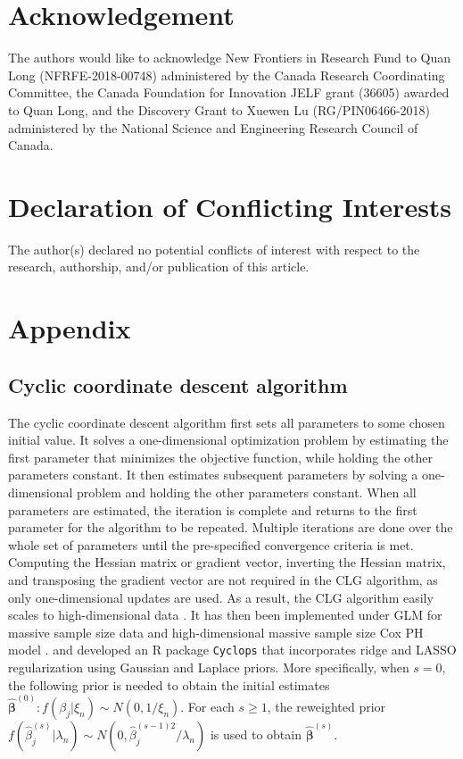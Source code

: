 \documentclass[11pt]{article}
\begin{document}
\section*{Acknowledgement}
The authors would like to acknowledge New Frontiers in Research Fund to Quan Long (NFRFE-2018-00748) administered by the Canada Research Coordinating Committee, the Canada Foundation for Innovation JELF grant (36605) awarded to Quan Long, and the Discovery Grant to Xuewen Lu (RG/PIN06466-2018) administered by the National Science and Engineering Research Council of Canada. 

\section*{Declaration of Conflicting Interests} 

The author(s) declared no potential conflicts of interest with respect to the research, authorship, and/or publication of this article.



\newpage

\section*{Appendix}
\subsection*{Cyclic coordinate descent algorithm}
The cyclic coordinate descent algorithm first sets all parameters to some chosen initial value. It solves a one-dimensional optimization problem by estimating the first parameter that minimizes the objective function, while holding the other parameters constant. It then estimates subsequent parameters by solving a one-dimensional problem and holding the other parameters constant. When all parameters are estimated, the iteration is complete and returns to the first parameter for the algorithm to be repeated. Multiple iterations are done over the whole set of parameters until the pre-specified convergence criteria is met. Computing the Hessian matrix or gradient vector, inverting the Hessian matrix, and transposing the gradient vector are not required in the CLG algorithm, as only one-dimensional updates are used. As a result, the CLG algorithm easily scales to high-dimensional data \citep{wu2008coordinate, simon2011regularization, gorst2012coordinate}. It has then been implemented under GLM for massive sample size data \citep{suchard2013massive, li2021scalable} and high-dimensional massive sample size Cox PH model \citep{mittal2014high}. \citet{suchard2013massive} and \citet{mittal2014high} developed an R package \verb|Cyclops| that incorporates ridge and LASSO regularization using Gaussian and Laplace priors. More specifically, when $s=0$, the following prior is needed to obtain the initial estimates $\widehat{\boldsymbol{\beta}}^{(0)}: f(\beta_j | \xi_n) \sim N(0, 1/ \xi_n)$. For each $s \geq 1$, the reweighted prior $f(\widehat{\beta}^{(s)}_j | \lambda_n) \sim N(0, \widehat{\beta}^{(s-1)2}_j/\lambda_n)$ is used to obtain $\widehat{\boldsymbol{\beta}}^{(s)}$.
\end{document}
